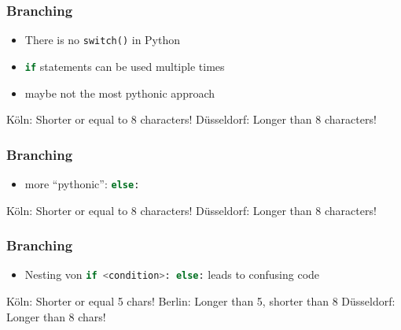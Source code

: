 \documentclass[ngerman]{beamer}
\newcommand{\ta}[1]{\textattachfile[color=1 0 0]{#1}{Code}}
\begin{document}
\begin{frame}[containsverbatim]
\frametitle{Branching}

\begin{itemize}
\item There is no \texttt{switch()} in Python
\item \lstinline[language={Python}]{if} statements can be used multiple times
\item maybe not the most pythonic approach
\end{itemize}



\begin{ausgabe}
Köln: Shorter or equal to 8 characters!
Düsseldorf: Longer than 8 characters!
\end{ausgabe}
\end{frame}


\begin{frame}[containsverbatim]
\frametitle{Branching}

\begin{itemize}
\item more \enquote{pythonic}:  \lstinline[language={Python}]{else:}
\end{itemize}



\begin{ausgabe}
Köln: Shorter or equal to 8 characters!
Düsseldorf: Longer than 8 characters!
\end{ausgabe}

\end{frame}

\begin{frame}[containsverbatim]
\frametitle{Branching}

\begin{itemize}
\item Nesting von \lstinline[language={Python}]{if <condition>: else:} leads to confusing code
\end{itemize}



\begin{ausgabe}
Köln: Shorter or equal 5 chars!
Berlin: Longer than 5, shorter than 8
Düsseldorf: Longer than 8 chars!
\end{ausgabe}

\end{frame}
\end{document}
